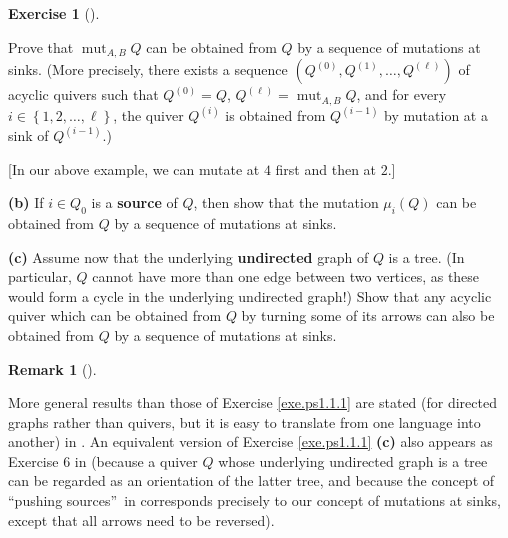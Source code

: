 \documentclass[numbers=enddot,12pt,final,onecolumn,notitlepage]{scrartcl}%
\newcounter{exer}
\numberwithin{exer}{section}
\theoremstyle{definition}
\newtheorem{remk}[theo]{Remark}
\newenvironment{remark}[1][]
{\begin{remk}[#1]\begin{leftbar}}
{\end{leftbar}\end{remk}}
\newtheorem{exmp}[exer]{Exercise}
\newenvironment{exercise}[1][]
{\begin{exmp}[#1]\begin{leftbar}}
{\end{leftbar}\end{exmp}}
\begin{document}
\begin{exercise}
Prove that $\operatorname*{mut}\nolimits_{A,B}Q$ can be obtained from $Q$ by a
sequence of mutations at sinks. (More precisely, there exists a sequence
$\left(  Q^{\left(  0\right)  },Q^{\left(  1\right)  },\ldots,Q^{\left(
\ell\right)  }\right)  $ of acyclic quivers such that $Q^{\left(  0\right)
}=Q$, $Q^{\left(  \ell\right)  }=\operatorname*{mut}\nolimits_{A,B}Q$, and for
every $i\in\left\{  1,2,\ldots,\ell\right\}  $, the quiver $Q^{\left(
i\right)  }$ is obtained from $Q^{\left(  i-1\right)  }$ by mutation at a sink
of $Q^{\left(  i-1\right)  }$.)

[In our above example, we can mutate at $4$ first and then at $2$.] \medskip

\textbf{(b)} If $i\in Q_{0}$ is a \textbf{source} of $Q$, then show that the
mutation $\mu_{i}\left(  Q\right)  $ can be obtained from $Q$ by a sequence of
mutations at sinks. \medskip

\textbf{(c)} Assume now that the underlying \textbf{undirected} graph of $Q$
is a tree. (In particular, $Q$ cannot have more than one edge between two
vertices, as these would form a cycle in the underlying undirected graph!)
Show that any acyclic quiver which can be obtained from $Q$ by turning some of
its arrows can also be obtained from $Q$ by a sequence of mutations at sinks.
\end{exercise}

\begin{remark}
More general results than those of Exercise \ref{exe.ps1.1.1} are stated (for
directed graphs rather than quivers, but it is easy to translate from one
language into another) in \cite{Pretzel}. An equivalent version of Exercise
\ref{exe.ps1.1.1} \textbf{(c)} also appears as Exercise 6 in \cite{mt3}
(because a quiver $Q$ whose underlying undirected graph is a tree can be
regarded as an orientation of the latter tree, and because the concept of
\textquotedblleft pushing sources\textquotedblright\ in \cite{mt3} corresponds
precisely to our concept of mutations at sinks, except that all arrows need to
be reversed).
\end{remark}
\end{document}
